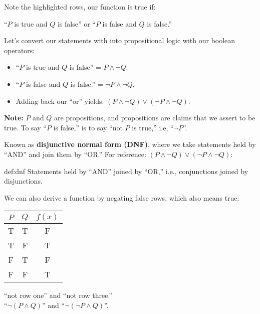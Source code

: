 \noindent
Note the highlighted rows, our function is true if:
\begin{center}
    \large
    ``$P$ is true and $Q$ is false'' or ``$P$ is false and $Q$ is false.''\\
\end{center}

\noindent
Let's convert our statements with into propositional logic with our boolean operators:
\begin{itemize}
    \item ``$P$ is true and $Q$ is false'' = $P \land \neg Q$.
    \item ``$P$ is false and $Q$ is false.'' = $\neg P \land \neg Q$.
    \item Adding back our ``or'' yields: $(P \land \neg Q) \lor (\neg P \land \neg Q)$.
\end{itemize}

\begin {Note}
\textbf{Note:} $P$ and $Q$ are propositions, and propositions are claims that we assert to be true.
To say ``$P$ is false,'' is to say ``not $P$ is true,'' i.e, ``$\neg P$''.
\end{Note}

\newpage

\noindent
Known as \textbf{disjunctive normal form (DNF)}, where we take statements held by
``AND'' and join them by ``OR.'' For reference: $(P \land \neg Q) \lor (\neg P \land \neg Q)$:

\begin{Def}{def:dnf}
    Statements held by ``AND'' joined by ``OR,'' i.e., conjunctions joined by disjunctions.
\end{Def}

\noindent
We can also derive a function by negating false rows, which also means true:\\
\begin{center}
    \begin{tabular}{|c|c|c|}
        \hline
        \rowcolor{OliveGreen!10}
        $P$ & $Q$ & $f(x)$ \\
        \hline
        \rowcolor{purple!10}
        T   & T   & F      \\
        T   & F   & T      \\
        \rowcolor{purple!10}
        F   & T   & F      \\
        F   & F   & T      \\
        \hline
    \end{tabular}
\end{center}
\begin{center}
    \large
    ``not row one'' and ``not row three.''\\
    ``$\neg(P \land Q)$'' and ``$\neg(\neg P \land Q)$''.
\end{center}

